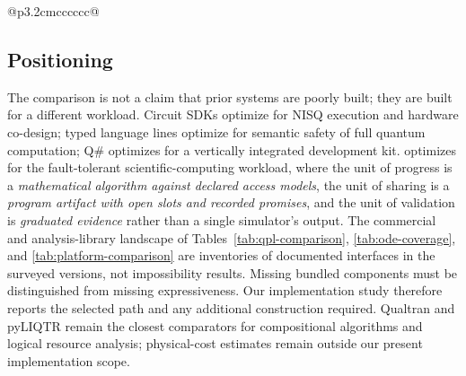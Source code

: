 \begin{table}[t]
\begin{tabular}{@{}p{3.2cm}cccccc@{}}
    \bottomrule
  \end{tabular}
\end{table}

\subsection{Positioning}
\label{sec:positioning}

The comparison is not a claim that prior systems are poorly built; they are
built for a different workload.  Circuit SDKs optimize for NISQ execution
and hardware co-design; typed language lines optimize for semantic safety
of full quantum computation; Q\# optimizes for a vertically integrated
development kit.  \pqlang{} optimizes for the fault-tolerant
scientific-computing workload, where the unit of progress is a
\emph{mathematical algorithm against declared access models}, the unit of
sharing is a \emph{program artifact with open slots and recorded promises},
and the unit of validation is \emph{graduated evidence} rather than a single
simulator's output.  The commercial and analysis-library landscape of
Tables~\ref{tab:qpl-comparison}, \ref{tab:ode-coverage}, and
\ref{tab:platform-comparison} are inventories of documented interfaces in
the surveyed versions, not impossibility results. Missing bundled
components must be distinguished from missing expressiveness.
Our implementation study therefore reports the selected path and any
additional construction required. Qualtran and pyLIQTR remain the closest
comparators for compositional algorithms and logical resource analysis;
physical-cost estimates remain outside our present implementation scope.
